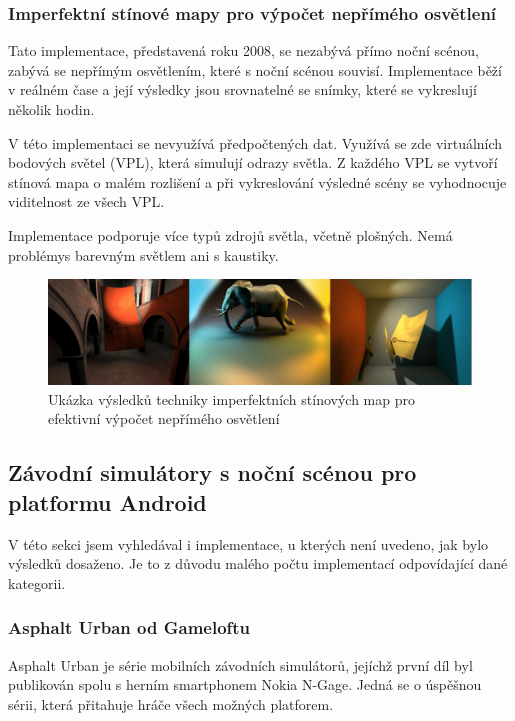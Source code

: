 \documentclass[11pt,twoside,a4paper]{book}
\begin{document}
\subsubsection{Imperfektní stínové mapy pro výpočet nepřímého osvětlení}
Tato implementace, představená roku 2008, se nezabývá přímo noční scénou, zabývá se nepřímým osvětlením, které s noční scénou souvisí. Implementace běží v reálném čase a její výsledky jsou srovnatelné se snímky, které se vykreslují několik hodin.

V této implementaci se nevyužívá předpočtených dat. Využívá se zde virtuálních bodových světel (VPL), která simulují odrazy světla. Z každého VPL se vytvoří stínová mapa o malém rozlišení a při vykreslování výsledné scény se vyhodnocuje viditelnost ze všech VPL.

Implementace podporuje více typů zdrojů světla, včetně plošných. Nemá problémy\linebreak s barevným světlem ani s kaustiky.

\begin{center}
\begin{figure}[h!]
\includegraphics[width=150mm]{figures/ISM.png}
\caption{Ukázka výsledků techniky imperfektních stínových map pro efektivní výpočet nepřímého osvětlení}
\end{figure}
\end{center}

\subsection{Závodní simulátory s noční scénou pro platformu Android}
V této sekci jsem vyhledával i implementace, u kterých není uvedeno, jak bylo výsledků dosaženo. Je to z důvodu malého počtu implementací odpovídající dané kategorii.

\subsubsection{Asphalt Urban od Gameloftu}
Asphalt Urban je série mobilních závodních simulátorů, jejíchž první díl byl publikován spolu s herním smartphonem Nokia N-Gage. Jedná se o úspěšnou sérii, která přitahuje hráče všech možných platforem.
\end{document}
